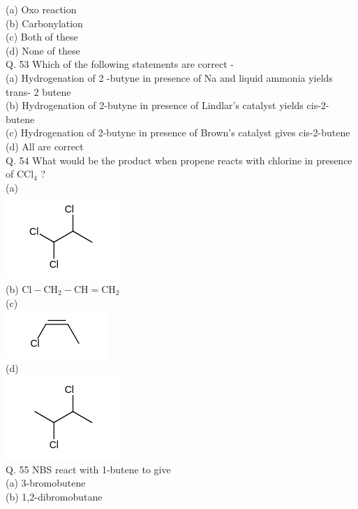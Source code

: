 \documentclass[10pt]{article}
\begin{document}
(a) Oxo reaction\\
(b) Carbonylation\\
(c) Both of these\\
(d) None of these\\
Q. 53 Which of the following statements are correct -\\
(a) Hydrogenation of 2 -butyne in presence of Na and liquid ammonia yields trans- 2 butene\\
(b) Hydrogenation of 2-butyne in presence of Lindlar's catalyst yields cis-2-butene\\
(c) Hydrogenation of 2-butyne in presence of Brown's catalyst gives cis-2-butene\\
(d) All are correct\\
Q. 54 What would be the product when propene reacts with chlorine in presence of $\mathrm{CCl}_{4}$ ?\\
(a)\\
\includegraphics{smile-3c7a08d5f85820475775b1da56e4fa7eaeda789d}\\
(b) $\mathrm{Cl}-\mathrm{CH}_{2}-\mathrm{CH}=\mathrm{CH}_{2}$\\
(c)\\
\includegraphics{smile-d71506c0c2f588befd4619235439ab22ed5aaeb9}\\
(d)\\
\includegraphics{smile-354dd67856c1744edfb1aac2d57dd5d27d3d943a}\\
Q. 55 NBS react with 1-butene to give\\
(a) 3-bromobutene\\
(b) 1,2-dibromobutane\\
\end{document}
